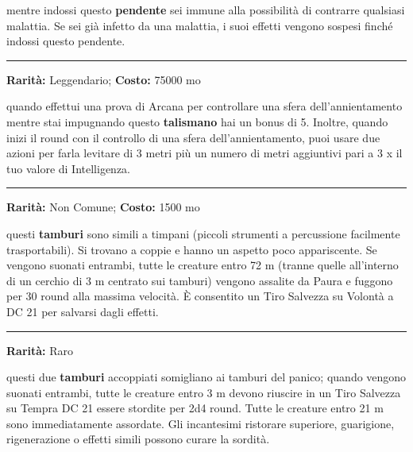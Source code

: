 \begin{multicols}{2}
mentre indossi questo \textbf{pendente} sei immune alla possibilità di contrarre qualsiasi malattia. Se sei già infetto da una malattia, i suoi effetti vengono sospesi finché indossi questo pendente.

\smallskip\noindent\rule{\linewidth}{2pt}  \hypertarget{TalismanodellaSfera}{}\medskip{}\noindent\label{TalismanodellaSfera}

\textbf{Rarità:} Leggendario; \textbf{Costo:} 75000 mo

quando effettui una prova di Arcana per controllare una sfera dell'annientamento mentre stai impugnando questo \textbf{talismano} hai un bonus di 5. Inoltre, quando inizi il round con il controllo di una sfera dell'annientamento, puoi usare due azioni per farla levitare di 3 metri più un numero di metri aggiuntivi pari a 3 x il tuo valore di Intelligenza.

\smallskip\noindent\rule{\linewidth}{2pt}  \hypertarget{TamburidelPanico}{}\medskip{}\noindent\label{TamburidelPanico}

\textbf{Rarità:} Non Comune; \textbf{Costo:} 1500 mo

questi \textbf{tamburi} sono simili a timpani (piccoli strumenti a percussione facilmente trasportabili). Si trovano a coppie e hanno un aspetto poco appariscente. Se vengono suonati entrambi, tutte le creature entro 72 m (tranne quelle all'interno di un cerchio di 3 m centrato sui tamburi) vengono assalite da Paura e fuggono per 30 round alla massima velocità. È consentito un Tiro Salvezza su Volontà a DC 21 per salvarsi dagli effetti.

\smallskip\noindent\rule{\linewidth}{2pt}  \hypertarget{TamburidelloStordimento}{}\medskip{}\noindent\label{TamburidelloStordimento}

\textbf{Rarità:} Raro

questi due \textbf{tamburi} accoppiati somigliano ai tamburi del panico; quando vengono suonati entrambi, tutte le creature entro 3 m devono riuscire in un Tiro Salvezza su Tempra DC 21 essere stordite per 2d4 round. Tutte le creature entro 21 m sono immediatamente assordate. Gli incantesimi ristorare superiore, guarigione, rigenerazione o effetti simili possono curare la sordità.


\end{multicols}
